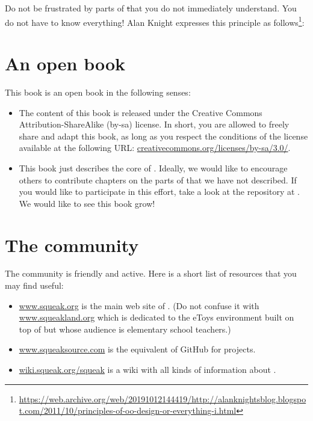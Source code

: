 \documentclass[a4paper,10pt,twoside]{book}
\begin{document}
Do not be frustrated by parts of \st that you do not immediately understand.
You do not have to know everything!
Alan Knight expresses this principle as follows\footnote{\url{https://web.archive.org/web/20191012144419/http://alanknightsblog.blogspot.com/2011/10/principles-of-oo-design-or-everything-i.html}}:

\section*{An open book}

This book is an open book in the following senses:

\begin{itemize}

\item	The content of this book is released under the Creative Commons Attribution-ShareAlike (by-sa) license.
		In short, you are allowed to freely share and adapt this book, as long as you respect the conditions of the license available at the following URL:
		\url{creativecommons.org/licenses/by-sa/3.0/}.

\item	This book just describes the core of \sq.
		Ideally, we would like to encourage others to contribute chapters on the parts of \sq that we have not described.
		If you would like to participate in this effort, take a look at the repository at \sbeRepoUrl.
		We would like to see this book grow!
\end{itemize}

\section*{The \sq community}

The \sq community is friendly and active.
Here is a short list of resources that you may find useful:

\begin{itemize}
\item \url{www.squeak.org} is the main web site of \sq.
(Do not confuse it with \url{www.squeakland.org} which is dedicated to the eToys environment built on top of \sq but whose audience is elementary school teachers.)

\item \url{www.squeaksource.com} is the equivalent of GitHub for \sq projects.

\item \url{wiki.squeak.org/squeak} is a wiki with all kinds of information about \sq.
\end{itemize}
\end{document}
